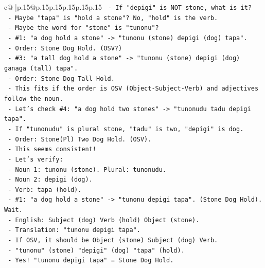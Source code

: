 \documentclass{article}
\begin{document}
{\begin{supertabular}{c@{$\;$}|p{.15\linewidth}@{}p{.15\linewidth}p{.15\linewidth}p{.15\linewidth}p{.15\linewidth}p{.15\linewidth}}
{{{\texttt{            {-} If "depigi" is NOT stone, what is it?} \\
\texttt{            {-} Maybe "tapa" is "hold a stone"? No, "hold" is the verb.} \\
\texttt{            {-} Maybe the word for "stone" is "tunonu"?} \\
\texttt{              {-} \#1: "a dog hold a stone" {-}> "tunonu (stone) depigi (dog) tapa".} \\
\texttt{              {-} Order: Stone Dog Hold. (OSV?)} \\
\texttt{              {-} \#3: "a tall dog hold a stone" {-}> "tunonu (stone) depigi (dog) ganaga (tall) tapa".} \\
\texttt{              {-} Order: Stone Dog Tall Hold.} \\
\texttt{              {-} This fits if the order is OSV (Object{-}Subject{-}Verb) and adjectives follow the noun.} \\
\texttt{              {-} Let's check \#4: "a dog hold two stones" {-}> "tunonudu tadu depigi tapa".} \\
\texttt{              {-} If "tunonudu" is plural stone, "tadu" is two, "depigi" is dog.} \\
\texttt{              {-} Order: Stone(Pl) Two Dog Hold. (OSV).} \\
\texttt{              {-} This seems consistent!} \\
\texttt{              {-} Let's verify:} \\
\texttt{                {-} Noun 1: tunonu (stone). Plural: tunonudu.} \\
\texttt{                {-} Noun 2: depigi (dog).} \\
\texttt{                {-} Verb: tapa (hold).} \\
\texttt{                {-} \#1: "a dog hold a stone" {-}> "tunonu depigi tapa". (Stone Dog Hold). Wait.} \\
\texttt{                  {-} English: Subject (dog) Verb (hold) Object (stone).} \\
\texttt{                  {-} Translation: "tunonu depigi tapa".} \\
\texttt{                  {-} If OSV, it should be Object (stone) Subject (dog) Verb.} \\
\texttt{                  {-} "tunonu" (stone) "depigi" (dog) "tapa" (hold).} \\
\texttt{                  {-} Yes! "tunonu depigi tapa" = Stone Dog Hold.} \\
}}}
\end{supertabular}}
\end{document}
